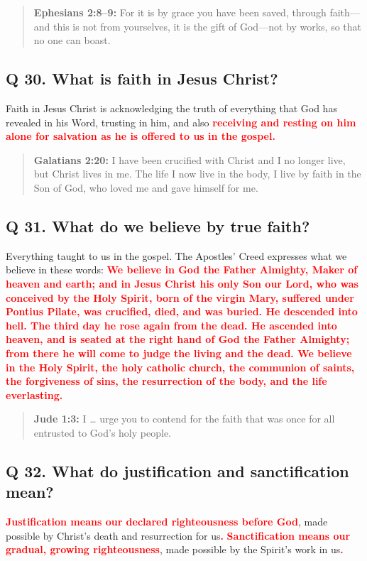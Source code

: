 \documentclass[]{memoir}
\newcommand\Children[1]{\textbf{\textcolor{red}{#1}}}
\newcommand\Quote[2]{\begin{quote}{\textbf{#1:}{ #2}}\end{quote}}
\begin{document}
\Quote{Ephesians 2:8--9}{For it is by grace you have been saved, through faith\thinspace{}---\thinspace{}and this is not from yourselves, it is the gift of God\thinspace{}---\thinspace{}not by works, so that no one can boast.}

\subsection{Q 30. What is faith in Jesus Christ?}
Faith in Jesus Christ is acknowledging the truth of everything that God has revealed in his Word, trusting in him, and also \Children{receiving and resting on him alone for salvation as he is offered to us in the gospel.}

\Quote{Galatians 2:20}{I have been crucified with Christ and I no longer live, but Christ lives in me. The life I now live in the body, I live by faith in the Son of God, who loved me and gave himself for me.}

\subsection{Q 31. What do we believe by true faith?}
Everything taught to us in the gospel. The Apostles' Creed expresses what we believe in these words: \Children{We believe in God the Father Almighty, Maker of heaven and earth; and in Jesus Christ his only Son our Lord, who was conceived by the Holy Spirit, born of the virgin Mary, suffered under Pontius Pilate, was crucified, died, and was buried. He descended into hell. The third day he rose again from the dead. He ascended into heaven, and is seated at the right hand of God the Father Almighty; from there he will come to judge the living and the dead. We believe in the Holy Spirit, the holy catholic church, the communion of saints, the forgiveness of sins, the resurrection of the body, and the life everlasting.}

\Quote{Jude 1:3}{I {\dots} urge you to contend for the faith that was once for all entrusted to God's holy people.}

\subsection{Q 32. What do justification and sanctification mean?}
\Children{Justification means our declared righteousness before God}, made possible by Christ's death and resurrection for us\Children{.} \Children{Sanctification means our gradual, growing righteousness}, made possible by the Spirit's work in us\Children{.}
\end{document}
